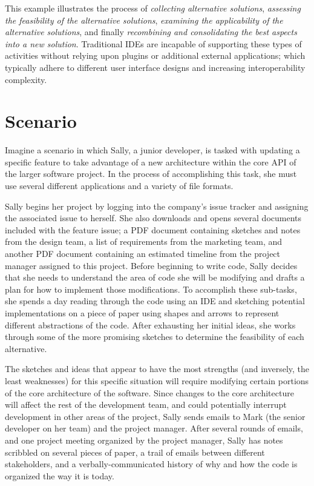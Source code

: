 \documentclass{ppig}
\begin{document}
This example illustrates the process of \textit{collecting alternative solutions}, 
\textit{assessing the feasibility of the alternative solutions}, \textit{examining the applicability of the alternative solutions}, and finally \textit{recombining and consolidating the best aspects into a new solution}.
Traditional IDEs are incapable of supporting these types of activities without relying upon plugins or additional external applications; which typically adhere to different user interface designs and increasing interoperability complexity.

\section{Scenario}

Imagine a scenario in which Sally, a junior developer, is tasked with updating a specific feature to take advantage of a new architecture within the core API of the larger software project. In the process of accomplishing this task, she must use several different applications and a variety of file formats.

Sally begins her project by logging into the company's issue tracker and assigning the associated issue to herself.
She also downloads and opens several documents included with the feature issue; a PDF document containing sketches and notes from the design team, a list of requirements from the marketing team, and another PDF document containing an estimated timeline from the project manager assigned to this project.
Before beginning to write code, Sally decides that she needs to understand the area of code she will be modifying and drafts a plan for how to implement those modifications.
To accomplish these sub-tasks, she spends a day reading through the code using an IDE and sketching potential implementations on a piece of paper using shapes and arrows to represent different abstractions of the code.
After exhausting her initial ideas, she works through some of the more promising sketches to determine the feasibility of each alternative.

The sketches and ideas that appear to have the most strengths (and inversely, the least weaknesses) for this specific situation will require modifying certain portions of the core architecture of the software.
Since changes to the core architecture will affect the rest of the development team, and could potentially interrupt development in other areas of the project, Sally sends emails to Mark (the senior developer on her team) and the project manager.
After several rounds of emails, and one project meeting organized by the project manager, Sally has notes scribbled on several pieces of paper, a trail of emails between different stakeholders, and a verbally-communicated history of why and how the code is organized the way it is today.
\end{document}
